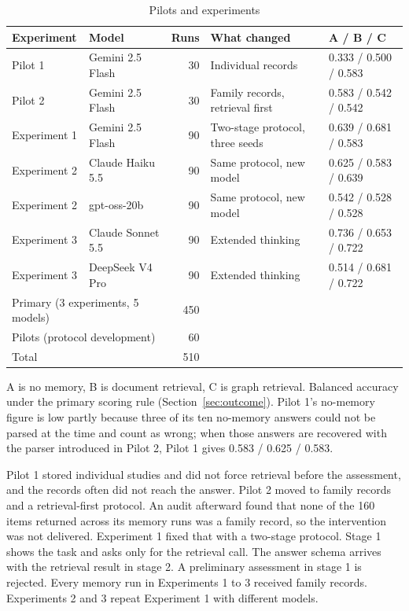 \documentclass[11pt]{article}
\begin{document}
\begin{table}[ht]
\centering
\caption{Pilots and experiments}
\label{tab:experiments}
\small
\begin{tabular}{llrll}
\toprule
Experiment & Model & Runs & What changed & A / B / C \\
\midrule
Pilot 1 & Gemini 2.5 Flash & 30 & Individual records & 0.333 / 0.500 / 0.583 \\
Pilot 2 & Gemini 2.5 Flash & 30 & Family records, retrieval first & 0.583 / 0.542 / 0.542 \\
\midrule
Experiment 1 & Gemini 2.5 Flash & 90 & Two-stage protocol, three seeds & 0.639 / 0.681 / 0.583 \\
Experiment 2 & Claude Haiku 5.5 & 90 & Same protocol, new model & 0.625 / 0.583 / 0.639 \\
Experiment 2 & gpt-oss-20b & 90 & Same protocol, new model & 0.542 / 0.528 / 0.528 \\
Experiment 3 & Claude Sonnet 5.5 & 90 & Extended thinking & 0.736 / 0.653 / 0.722 \\
Experiment 3 & DeepSeek V4 Pro & 90 & Extended thinking & 0.514 / 0.681 / 0.722 \\
\midrule
\multicolumn{2}{l}{Primary (3 experiments, 5 models)} & 450 & & \\
\multicolumn{2}{l}{Pilots (protocol development)} & 60 & & \\
\multicolumn{2}{l}{Total} & 510 & & \\
\bottomrule
\end{tabular}

\vspace{0.4em}
\begin{minipage}{0.92\linewidth}\footnotesize
A is no memory, B is document retrieval, C is graph retrieval. Balanced accuracy under the primary scoring rule (Section~\ref{sec:outcome}). Pilot 1's no-memory figure is low partly because three of its ten no-memory answers could not be parsed at the time and count as wrong; when those answers are recovered with the parser introduced in Pilot 2, Pilot 1 gives 0.583 / 0.625 / 0.583.
\end{minipage}
\end{table}

Pilot 1 stored individual studies and did not force retrieval before the assessment, and the records often did not reach the answer. Pilot 2 moved to family records and a retrieval-first protocol. An audit afterward found that none of the 160 items returned across its memory runs was a family record, so the intervention was not delivered. Experiment 1 fixed that with a two-stage protocol. Stage 1 shows the task and asks only for the retrieval call. The answer schema arrives with the retrieval result in stage 2. A preliminary assessment in stage 1 is rejected. Every memory run in Experiments 1 to 3 received family records. Experiments 2 and 3 repeat Experiment 1 with different models.
\end{document}

